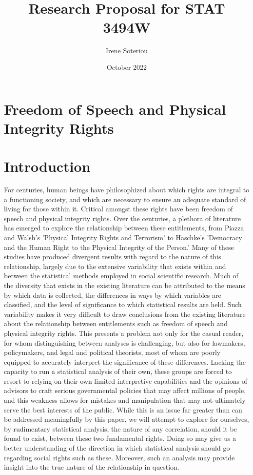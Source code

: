 \documentclass{article}
\title{Research Proposal for STAT 3494W}
\author{Irene Soteriou}
\date{October 2022}
\begin{document}
\maketitle

\section*{Freedom of Speech and Physical Integrity Rights}

\section{Introduction}

For centuries, human beings have philosophized about which rights are integral to a functioning society, and which are necessary to ensure an adequate standard of living for those within it. Critical amongst these rights have been freedom of speech and physical integrity rights. Over the centuries, a plethora of literature has emerged to explore the relationship between these entitlements, from Piazza and Walsh’s ’Physical Integrity Rights and Terrorism’ to Haschke’s ’Democracy and the Human Right to the Physical Integrity of the Person.’ Many of these studies have produced divergent results with regard to the nature of this relationship, largely due to the extensive variability that exists within and between the statistical methods employed in social scientific research. Much of the diversity that exists in the existing literature can be attributed to the means by which data is collected, the differences in ways by which variables are classified, and the level of significance to which statistical results are held. Such variability makes it very difficult to draw conclusions from the existing literature about the relationship between entitlements such as freedom of speech and physical integrity rights. This presents a problem not only for the casual reader, for whom distinguishing between analyses is challenging, but also for lawmakers, policymakers, and legal and political theorists, most of whom are poorly equipped to accurately interpret the significance of these differences. Lacking the capacity to run a statistical analysis of their own, these groups are forced to resort to relying on their own limited interpretive capabilities and the opinions of advisors to craft serious governmental policies that may affect millions of people, and this weakness allows for mistakes and manipulation that may not ultimately serve the best interests of the public. While this is an issue far greater than can be addressed meaningfully by this paper, we will attempt to explore for ourselves, by rudimentary statistical analysis, the nature of any correlation, should it be found to exist, between these two fundamental rights. Doing so may give us a better understanding of the direction in which statistical analysis should go regarding social rights such as these. Moreover, such an analysis may provide insight into the true nature of the relationship in question.
\end{document}
